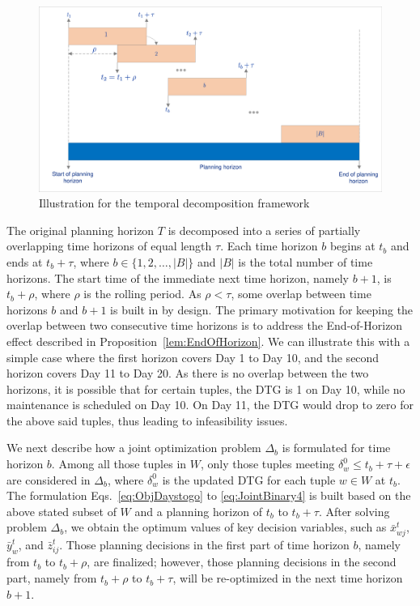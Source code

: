 \begin{figure}[htbp]
    \centering
    \includegraphics[width=\linewidth]{updated_temporal_decompositionv2.pdf}
    \caption{Illustration for the temporal decomposition framework}
    \label{fig:temp-dec_illustration}
\end{figure}



The original planning horizon $T$ is decomposed into a series of partially overlapping time horizons of equal length $\tau$. Each time horizon $b$ begins at $t_b$ and ends at $t_b + \tau$, where $b \in \{1, 2, \dots, |B|\}$ and $|B|$ is the total number of time horizons. The start time of the immediate next time horizon, namely $b+1$, is $t_b + \rho$, where $\rho$ is the rolling period. As $\rho < \tau$, some overlap between time horizons $b$ and $b+1$ is built in by design. The primary motivation for keeping the overlap between two consecutive time horizons is to address the End-of-Horizon effect described in Proposition~\ref{lem:EndOfHorizon}. We can illustrate this with a simple case where the first horizon covers Day 1 to Day 10, and the second horizon covers Day 11 to Day 20. As there is no overlap between the two horizons, it is possible that for certain tuples, the DTG is 1 on Day 10, while no maintenance is scheduled on Day 10. On Day 11, the DTG would drop to zero for the above said tuples, thus leading to infeasibility issues. 

We next describe how a joint optimization problem $\Delta_b$ is formulated for time horizon $b$. Among all those tuples in $W$, only those tuples meeting $\delta_w^0 \leq t_b + \tau + \epsilon$ are considered in $\Delta_b$, where $\delta_w^0$ is the updated DTG for each tuple $w \in W$ at $t_b$. The formulation Eqs.~\eqref{eq:ObjDaystogo} to \eqref{eq:JointBinary4} is built based on the above stated subset of $W$ and a planning horizon of $t_b$ to $t_b + \tau$. After solving problem $\Delta_b$, we obtain the optimum values of key decision variables, such as $\bar{x}_{wj}^t$, $\bar{y}_w^t$, and $\bar{z}_{ij}^t$. Those planning decisions in the first part of time horizon $b$, namely from $t_b$ to $t_b + \rho$, are finalized; however, those planning decisions in the second part, namely from $t_b + \rho$ to $t_b + \tau$, will be re-optimized in the next time horizon $b+1$. 

